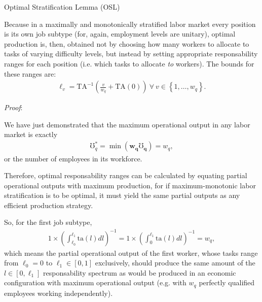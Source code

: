 \documentclass[hidelinks, nonatbib]{elsarticle}
\begin{document}
\begin{enumerate}

Optimal Stratification Lemma (OSL)

Because in a maximally and monotonically stratified labor market every position is its own job subtype (for, again, employment levels are unitary), optimal production is, then, obtained not by choosing how many workers to allocate to tasks of varying difficulty levels, but instead by setting appropriate responsability ranges for each position (i.e. which tasks to allocate \textit{to} workers). The bounds for these ranges are:
\begin{gather}
    \ell_v
    =
    \text{TA}^{-1}\left(
        \frac{v}{w_q}
        +
        \text{TA}(0)
    \right)
    \
    \forall
    \
    v \in 
    \left\{
        1, \dots, w_q
    \right\}
    .
\end{gather}

\textit{Proof}:

We have just demonstrated that the maximum operational output in any labor market is exactly 
\begin{gather}
    \mho_{q}^{*} =
    \min\left(
        \boldsymbol{w_q}
        \boldsymbol{\mho_{q}}
    \right)
    =
    w_q
    ,
\end{gather}
or the number of employees in its workforce.

Therefore, optimal responsability ranges can be calculated by equating partial operational outputs with maximum production, for if maximum-monotonic labor stratification is to be optimal, it must yield the same partial outputs as any efficient production strategy.

So, for the first job subtype,
\begin{gather}
    1 \times \left(
        \int_{\ell_0}^{\ell_1}
        \text{ta}(l)
        dl
    \right) ^ {-1}
    =
    1 \times \left(
        \int_{0}^{\ell_1}
        \text{ta}(l)
        dl
    \right) ^ {-1}
    =
    w_q
    ,
\end{gather}
which means the partial operational output of the first worker, whose tasks range from $\ell_0 = 0$ to $\ell_1 \in [0,1]$ exclusively, should produce the same amount of the $l \in [0,\ell_1]$ responsability spectrum as would be produced in an economic configuration with maximum operational output (e.g. with $w_q$ perfectly qualified employees working independently).


\end{enumerate}
\end{document}
